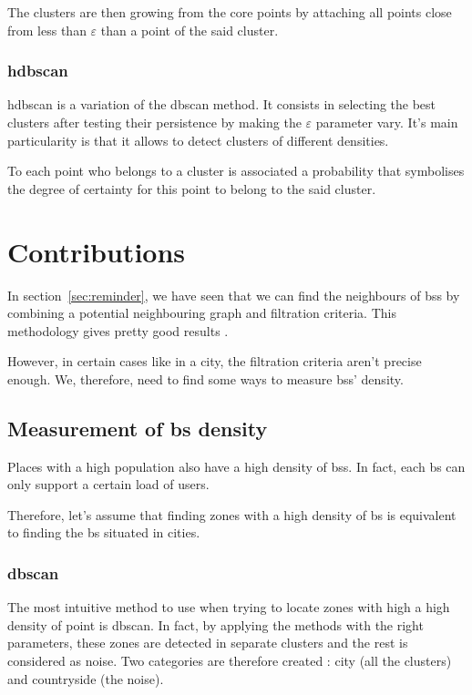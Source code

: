 \documentclass[lettersize,journal,english]{IEEEtran}
\begin{document}
            The clusters are then \og growing\fg{} from the core points by attaching all points close from less than $\varepsilon$ than a point of the said cluster.

        \subsubsection{\acrshort{hdbscan}}
            \acrshort{hdbscan} \cite{10.1007/978-3-642-37456-2_14} is a variation of the \acrshort{dbscan} method.
            It consists in selecting the best clusters after testing their persistence by making the $\varepsilon$ parameter vary. It's main particularity is that it allows to detect clusters of different densities.

            To each point who belongs to a cluster is associated a probability that symbolises the degree of certainty for this point to belong to the said cluster.

\section{Contributions\label{sec:contrib}}
    \noindent In section~\ref{sec:reminder}, we have seen that we can find the neighbours of \acrshort{bs}s by combining a potential neighbouring graph and filtration criteria. This methodology gives pretty good results \cite{art_del_paq}.

    However, in certain cases like in a city, the filtration criteria aren't precise enough. We, therefore, need to find some ways to measure \acrshort{bs}s' density.

    \subsection{Measurement of \acrshort{bs} density}
        Places with a high population also have a high density of \acrshort{bs}s. In fact, each \acrshort{bs} can only support a certain load of users.

        Therefore, let's assume that finding zones with a high density of \acrshort{bs} is equivalent to finding the \acrshort{bs} situated in \og cities\fg{}.

        \subsubsection{\acrshort{dbscan}}
            The most intuitive method to use when trying to locate zones with high a high density of point is \acrshort{dbscan}. In fact, by applying the methods with the right parameters, these zones are detected in separate clusters and the rest is considered as noise. Two categories are therefore created : city (all the clusters) and countryside (the noise).
\end{document}

